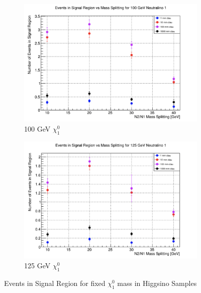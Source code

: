 \documentclass{article}
\begin{document}
\begin{figure} [H]
\begin{subfigure}{.5\textwidth}
  \centering
  \includegraphics[width=.8\linewidth]{100GeV.png}  
  \caption{100 GeV $\chi_{1}^{0}$}
  \label{fig:sub-first19}
\end{subfigure}
\begin{subfigure}{.5\textwidth}
  \centering
  \includegraphics[width=.8\linewidth]{125GeV.png}  
  \caption{125 GeV $\chi_{1}^{0}$}
  \label{fig:sub-second19}
\end{subfigure}
\caption{Events in Signal Region for fixed $\chi_{1}^{0}$ mass in Higgsino Samples}
\label{fig:19}
\end{figure}
\end{document}
